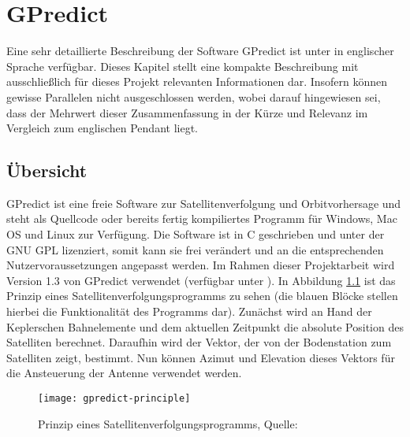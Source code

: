 
\chapter{GPredict}

Eine sehr detaillierte Beschreibung der Software GPredict ist unter \cite{gpredictmanual} in englischer Sprache verfügbar. Dieses Kapitel stellt eine kompakte Beschreibung mit ausschließlich für dieses Projekt relevanten Informationen dar. Insofern können gewisse Parallelen nicht ausgeschlossen werden, wobei darauf hingewiesen sei, dass der Mehrwert dieser Zusammenfassung in der Kürze und Relevanz im Vergleich zum englischen Pendant liegt.

\section{Übersicht}

GPredict ist eine freie Software zur Satellitenverfolgung und Orbitvorhersage und steht als Quellcode oder bereits fertig kompiliertes Programm für Windows, Mac OS und Linux zur Verfügung. Die Software ist in C geschrieben und unter der GNU \ac{GPL} lizenziert, somit kann sie frei verändert und an die entsprechenden Nutzervoraussetzungen angepasst werden. Im Rahmen dieser Projektarbeit wird Version 1.3 von GPredict verwendet (verfügbar unter \cite{gpredictdownload}).\newpar
In Abbildung \ref{fig:gpredict-principle} ist das Prinzip eines Satellitenverfolgungsprogramms zu sehen (die blauen Blöcke stellen hierbei die Funktionalität des Programms dar). Zunächst wird an Hand der Keplerschen Bahnelemente und dem aktuellen Zeitpunkt die absolute Position des Satelliten berechnet. Daraufhin wird der Vektor, der von der Bodenstation zum Satelliten zeigt, bestimmt. Nun können Azimut und Elevation dieses Vektors für die Ansteuerung der Antenne verwendet werden.

\begin{figure}[h]
	\centering
	\texttt{[image: gpredict-principle]}
	\caption{Prinzip eines Satellitenverfolgungsprogramms, Quelle: \cite{gpredictmanual}}
	\label{fig:gpredict-principle} 
\end{figure}


